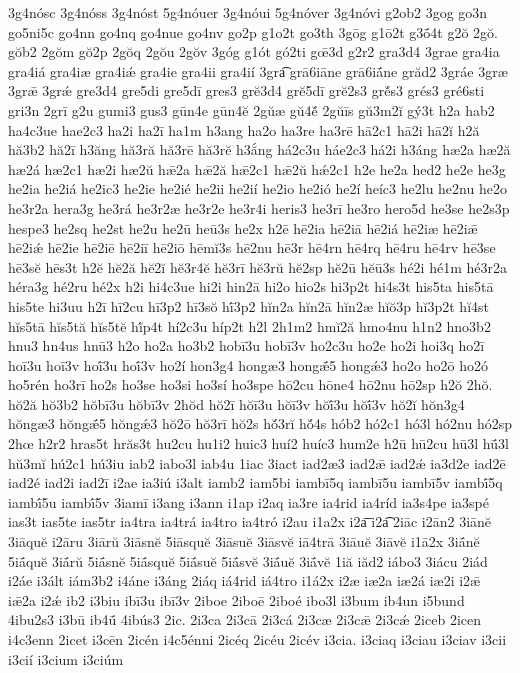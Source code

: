 {3g4nósc
3g4nóss
3g4nóst
5g4nóuer
3g4nóui
5g4nóver
3g4nóvi
g2ob2
3gog
go3n
go5ni5c
go4nn
go4nq
go4nue
go4nv
go2p
g1o2t
go3th
3gōg
g1ō2t
g3ṓ4t
g2ŏ
2gŏ.
gŏb2
2gŏm
gŏ2p
2gŏq
2gŏu
2gŏv
3góg
g1ót
gó2ti
gœ̄3d
g2r2
gra3d4
3grae
gra4ia
gra4iá
gra4iæ
gra4iǽ
gra4ie
gra4ii
gra4ií
3gra͡
grā6iāne
grā6iā́ne
grăd2
3gráe
3græ
3grǣ
3grǽ
gre3d4
gre5di
gre5dī
gres3
grĕ3d4
grĕ5dī
grĕ2s3
grĕ́s3
grés3
gré6sti
gri3n
2grī
g2u
gumi3
gus3
gūn4e
gūn4ĕ
2gŭæ
gŭ4ĕ́
2gŭīs
gŭ3m2ĭ
gý3t
h2a
hab2
ha4c3ue
hae2c3
ha2i
ha2ī
ha1m
h3ang
ha2o
ha3re
ha3rē
hā2c1
hā2i
hā2ĭ
h2ă
hă3b2
hă2ī
h3ăng
hă3ră
hă3rē
hă3rĕ
h3ắng
há2c3u
háe2c3
há2i
h3áng
hæ2a
hæ2ă
hæ2á
hæ2c1
hæ2i
hæ2ŭ
hǣ2a
hǣ2ă
hǣ2c1
hǣ2ŭ
hǽ2c1
h2e
he2a
hed2
he2e
he3g
he2ia
he2iá
he2ic3
he2ie
he2ié
he2ii
he2ií
he2io
he2ió
he2í
heíc3
he2lu
he2nu
he2o
he3r2a
hera3g
he3rá
he3r2æ
he3r2e
he3r4i
heris3
he3rī
he3ro
hero5d
he3se
he2s3p
hespe3
he2sq
he2st
he2u
he2ū
heū3s
he2x
h2ē
hē2ia
hē2iā
hē2iá
hē2iæ
hē2iǣ
hē2iǽ
hē2ie
hē2iē
hē2iī
hē2iō
hēmĭ3s
hē2nu
hē3r
hē4rn
hē4rq
hē4ru
hē4rv
hē3se
hē3sĕ
hēs3t
h2ĕ
hĕ2ă
hĕ2ĭ
hĕ3r4ĕ
hĕ3rī
hĕ3rŭ
hĕ2sp
hĕ2ū
hĕū3s
hé2i
hé1m
hé3r2a
héra3g
hé2ru
hé2x
h2i
hi4c3ue
hi2i
hin2ā
hi2o
hio2s
hi3p2t
hi4s3t
his5ta
his5tā
his5te
hi3uu
h2ī
hī2cu
hī3p2
hī3sŏ
hī́3p2
hĭn2a
hĭn2ā
hĭn2æ
hĭŏ3p
hĭ3p2t
hĭ4st
hĭs5tā
hĭs5tă
hĭs5tĕ
hĭ́p4t
hí2c3u
híp2t
h2l
2h1m2
hmĭ2ă
hmo4nu
h1n2
hno3b2
hnu3
hn4us
hnū3
h2o
ho2a
ho3b2
hobī3u
hobī3v
ho2c3u
ho2e
ho2i
hoi3q
ho2ī
hoī3u
hoī3v
hoī́3u
hoī́3v
ho2í
hon3g4
hongæ3
hongǣ́5
hongǽ3
ho2o
ho2ō
ho2ó
ho5rén
ho3rī
ho2s
ho3se
ho3si
ho3sí
ho3spe
hō2cu
hōne4
hō2nu
hō2sp
h2ŏ
2hŏ.
hŏ2ă
hŏ3b2
hŏbī3u
hŏbī3v
2hŏd
hŏ2ī
hŏī3u
hŏī3v
hŏī́3u
hŏī́3v
hŏ2ĭ
hŏn3g4
hŏngæ3
hŏngǣ́5
hŏngǽ3
hŏ2ō
hŏ3rī
hŏ2s
hŏ́3rĭ
hŏ́4s
hób2
hó2c1
hó3l
hó2nu
hó2sp
2hœ
h2r2
hras5t
hrăs3t
hu2cu
hu1i2
huic3
huí2
huíc3
hum2e
h2ū
hū2cu
hū3l
hū́3l
hŭ3mĭ
hú2c1
hú3iu
iab2
iabo3l
iab4u
1iac
3iact
iad2æ3
iad2ǣ
iad2ǽ
ia3d2e
iad2ē
iad2é
iad2i
iad2ī
i2ae
ia3iú
i3alt
iamb2
iam5bi
iambī5q
iambī5u
iambī5v
iambī́5q
iambī́5u
iambī́5v
3iamī
i3ang
i3ann
i1ap
i2aq
ia3re
ia4rid
ia4ríd
ia3s4pe
ia3spé
ias3t
ias5te
ias5tr
ia4tra
ia4trá
ia4tro
ia4tró
i2au
i1a2x
i2a͞
i2a͡
2iāc
i2ān2
3iānĕ
3iāquĕ
i2āru
3iārŭ
3iāsnĕ
5iāsquĕ
3iāsuĕ
3iāsvĕ
iā4trā
3iāuĕ
3iāvĕ
i1ā2x
3iā́nĕ
5iā́quĕ
3iā́rŭ
5iā́snĕ
5iā́squĕ
5iā́suĕ
5iā́svĕ
3iā́uĕ
3iā́vĕ
1iă
iăd2
iábo3
3iácu
2iád
i2áe
i3ált
iám3b2
i4áne
i3áng
2iáq
iá4rid
iá4tro
i1á2x
i2æ
iæ2a
iæ2á
iæ2i
i2ǣ
iǣ2a
i2ǽ
ib2
i3biu
ibī3u
ibī3v
2iboe
2iboē
2iboé
ibo3l
i3bum
ib4un
i5bund
4ibu2s3
i3bū
ib4ū́
4ibús3
2ic.
2i3ca
2i3cā
2i3cá
2i3cæ
2i3cǣ
2i3cǽ
2iceb
2icen
i4c3enn
2icet
i3cēn
2icén
i4c5énni
2icéq
2icéu
2icév
i3cia.
i3ciaq
i3ciau
i3ciav
i3cii
i3cií
i3cium
i3ciúm
}
